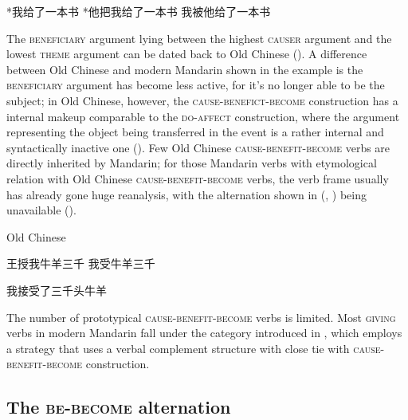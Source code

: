 \documentclass[UTF8, a4paper, oneside, scheme=plain, 12pt]{ctexrep}
\newcommand*{\category}[1]{\textsc{#1}}
\begin{document}
\begin{exe}
    \ex\label{ex:verb-phrase.cause.experience.1-notional-passive}  *我给了一本书
    \ex\label{ex:verb-phrase.cause.experience.1-ba} *他把我给了一本书
    \ex *我被他给了一本书
\end{exe}

The \category{beneficiary} argument lying between the highest \category{causer} argument 
and the lowest \category{theme} argument 
can be dated back to Old Chinese
().
A difference between Old Chinese and modern Mandarin shown in the example 
is the \category{beneficiary} argument 
has become less active, 
for it's no longer able to be the subject; 
in Old Chinese, however, the \category{cause}-\category{benefict}-\category{become}
construction has a internal makeup comparable to the 
\category{do}-\category{affect} construction,
where the argument representing the object being transferred in the event 
is a rather internal and syntactically inactive one 
().
Few Old Chinese \category{cause}-\category{benefit}-\category{become} verbs 
are directly inherited by Mandarin;
for those Mandarin verbs with etymological relation 
with Old Chinese \category{cause}-\category{benefit}-\category{become} verbs,
the verb frame usually has already gone huge reanalysis,
with the alternation shown in 
(, 
) being unavailable
().


\begin{exe}
    \ex \label{ex:verb-phrase.experience.oc-1} Old Chinese 
    \begin{xlist}
        \ex 王授我牛羊三千
        \ex\label{ex:verb-phrase.experience.oc-1b} 我受牛羊三千
    \end{xlist}
    \ex \label{ex:verb-phrase.experience.oc-to-m-1} 我接受了三千头牛羊
\end{exe}

The number of prototypical 
\category{cause}-\category{benefit}-\category{become} verbs 
is limited.
Most \category{giving} verbs in modern Mandarin 
fall under the category introduced in ,
which employs a strategy 
that uses a verbal complement structure 
with close tie with \category{cause}-\category{benefit}-\category{become} construction.

\subsection{The \category{be}-\category{become} alternation}\label{sec:vp.be-become}
\end{document}
